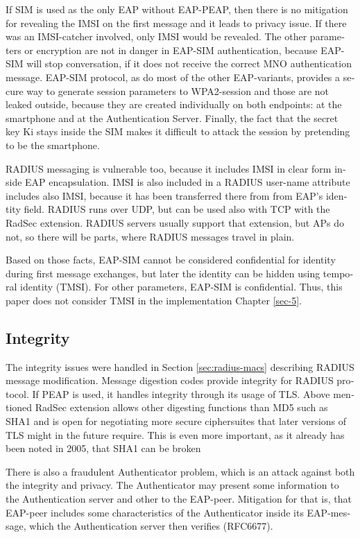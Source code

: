 \documentclass[12pt,a4paper,english]{tutthesis}
\begin{document}
\begin{otherlanguage}{english}
If SIM is used as the only EAP without EAP-PEAP, then there is no
mitigation for revealing the IMSI on the first message and it leads to
privacy issue.  If there was an IMSI-catcher involved, only IMSI would
be revealed.  The other parameters or encryption are not in danger in
EAP-SIM authentication, because EAP-SIM will stop conversation, if it
does not receive the correct MNO authentication message.  EAP-SIM
protocol, as do most of the other EAP-variants, provides a secure way
to generate session parameters to WPA2-session and those are not
leaked outside, because they are created individually on both
endpoints: at the smartphone and at the Authentication Server.
Finally, the fact that the secret key Ki stays inside the SIM makes it
difficult to attack the session by pretending to be the smartphone.






RADIUS messaging is vulnerable too, because it includes IMSI in clear form 
inside EAP encapsulation. IMSI is also included in a RADIUS user-name
attribute includes also IMSI, because it has been transferred there from
from EAP's identity field.
RADIUS runs over UDP, but can be used also with TCP with the RadSec
extension. RADIUS servers usually support that extension, but APs do not, so 
there will be parts, where RADIUS messages travel in plain.




Based on those facts, EAP-SIM cannot be considered confidential for identity
during first message exchanges, but later the identity can be hidden
using temporal identity (TMSI). 
For other parameters, EAP-SIM is confidential.
Thus, this paper does not consider TMSI in the implementation Chapter
\ref{sec-5}.
\subsection{Integrity}
\label{sec-6-4-2}
The integrity issues were handled in Section \ref{sec:radius-macs} describing
RADIUS message modification.
Message digestion codes provide integrity for RADIUS protocol.
If PEAP is used, it handles integrity through its usage of
 TLS\cite{peap}.
Above mentioned RadSec extension allows other digesting functions than MD5 such
as SHA1 and is open for negotiating more secure ciphersuites that later
versions of TLS might in the future require\cite{rfc6614}. This is
even more important, as it already has been noted in 2005, that SHA1 can be
broken

There is also a fraudulent Authenticator problem, which is an attack
against both the integrity and privacy.  The Authenticator may present
some information to the Authentication server and other to the
EAP-peer. Mitigation for that is, that EAP-peer includes some
characteristics of the Authenticator inside its EAP-message, which
the Authentication server then verifies (RFC6677)\cite{rfc6677}.


\end{otherlanguage}
\end{document}
